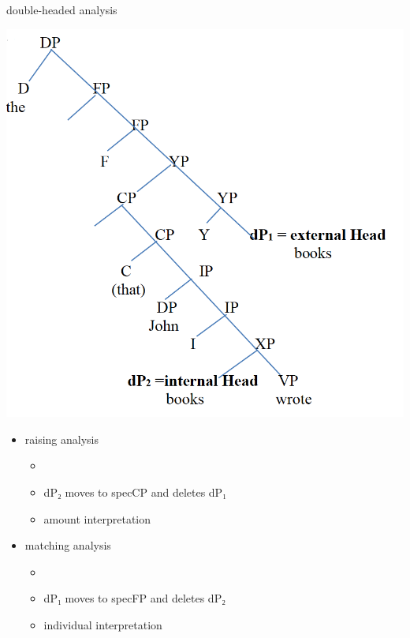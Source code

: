 \documentclass[12pt]{beamer}
\begin{document}

\begin{frame}{ double-headed analysis}

	\begin{minipage}[t]{0.47\textwidth}
  \includegraphics[width=1.1\linewidth]{cinque-tree}    \pause

  \end{minipage}\hfill\vline\hfill
	\begin{minipage}[t]{0.47\textwidth}
    \vspace{-15em}
\begin{itemize}
  \item raising analysis
  \begin{itemize}
    \item {}
    \item dP₂ moves to specCP and deletes dP₁
    \item amount interpretation
  \end{itemize} \pause
  \item matching analysis
  \begin{itemize}
    \item {}
    \item dP₁ moves to specFP and deletes dP₂
    \item individual interpretation
  \end{itemize}
\end{itemize}

	\end{minipage}

\end{frame}
\end{document}
